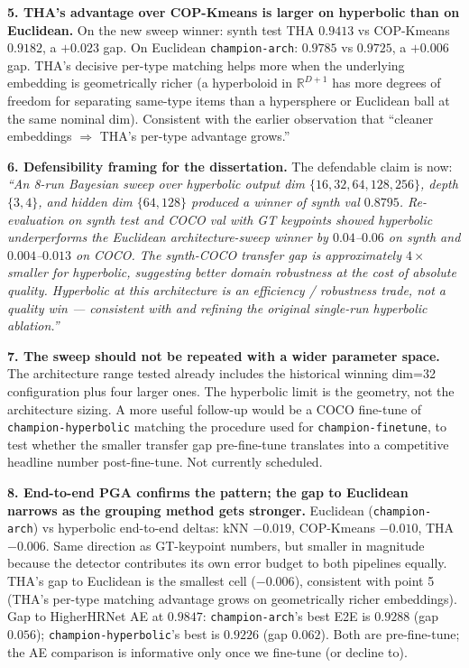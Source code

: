 \textbf{5. THA's advantage over COP-Kmeans is larger on hyperbolic than on Euclidean.} On the new sweep winner: synth test THA $0.9413$ vs COP-Kmeans $0.9182$, a $+0.023$ gap. On Euclidean \texttt{champion-arch}: $0.9785$ vs $0.9725$, a $+0.006$ gap. THA's decisive per-type matching helps more when the underlying embedding is geometrically richer (a hyperboloid in $\mathbb{R}^{D+1}$ has more degrees of freedom for separating same-type items than a hypersphere or Euclidean ball at the same nominal dim). Consistent with the earlier observation that ``cleaner embeddings $\Rightarrow$ THA's per-type advantage grows.''

\textbf{6. Defensibility framing for the dissertation.} The defendable claim is now: \emph{``An 8-run Bayesian sweep over hyperbolic output dim $\{16, 32, 64, 128, 256\}$, depth $\{3, 4\}$, and hidden dim $\{64, 128\}$ produced a winner of synth val $0.8795$. Re-evaluation on synth test and COCO val with GT keypoints showed hyperbolic underperforms the Euclidean architecture-sweep winner by $0.04$--$0.06$ on synth and $0.004$--$0.013$ on COCO. The synth-COCO transfer gap is approximately $4\times$ smaller for hyperbolic, suggesting better domain robustness at the cost of absolute quality. Hyperbolic at this architecture is an efficiency / robustness trade, not a quality win --- consistent with and refining the original single-run hyperbolic ablation.''}

\textbf{7. The sweep should not be repeated with a wider parameter space.} The architecture range tested already includes the historical winning dim=32 configuration plus four larger ones. The hyperbolic limit is the geometry, not the architecture sizing. A more useful follow-up would be a COCO fine-tune of \texttt{champion-hyperbolic} matching the procedure used for \texttt{champion-finetune}, to test whether the smaller transfer gap pre-fine-tune translates into a competitive headline number post-fine-tune. Not currently scheduled.

\textbf{8. End-to-end PGA confirms the pattern; the gap to Euclidean narrows as the grouping method gets stronger.} Euclidean (\texttt{champion-arch}) vs hyperbolic end-to-end deltas: kNN $-0.019$, COP-Kmeans $-0.010$, THA $-0.006$. Same direction as GT-keypoint numbers, but smaller in magnitude because the detector contributes its own error budget to both pipelines equally. THA's gap to Euclidean is the smallest cell ($-0.006$), consistent with point 5 (THA's per-type matching advantage grows on geometrically richer embeddings). Gap to HigherHRNet AE at $0.9847$: \texttt{champion-arch}'s best E2E is $0.9288$ (gap $0.056$); \texttt{champion-hyperbolic}'s best is $0.9226$ (gap $0.062$). Both are pre-fine-tune; the AE comparison is informative only once we fine-tune (or decline to).

